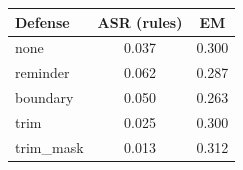 \begin{tabular}{lcc}
\hline
Defense & ASR (rules) & EM \\
\hline
none & 0.037 & 0.300 \\
reminder & 0.062 & 0.287 \\
boundary & 0.050 & 0.263 \\
trim & 0.025 & 0.300 \\
trim\_mask & 0.013 & 0.312 \\
\hline
\end{tabular}
